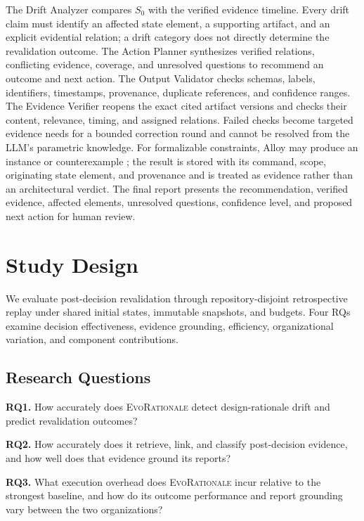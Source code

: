 \documentclass[10pt,conference]{IEEEtran}
\begin{document}
The Drift Analyzer compares $S_0$ with the verified evidence timeline. Every drift claim must identify an affected state element, a supporting artifact, and an explicit evidential relation; a drift category does not directly determine the revalidation outcome. The Action Planner synthesizes verified relations, conflicting evidence, coverage, and unresolved questions to recommend an outcome and next action. The Output Validator checks schemas, labels, identifiers, timestamps, provenance, duplicate references, and confidence ranges. The Evidence Verifier reopens the exact cited artifact versions and checks their content, relevance, timing, and assigned relations. Failed checks become targeted evidence needs for a bounded correction round and cannot be resolved from the LLM's parametric knowledge. For formalizable constraints, Alloy may produce an instance or counterexample \cite{Alhanahnah2025Alloy}; the result is stored with its command, scope, originating state element, and provenance and is treated as evidence rather than an architectural verdict. The final report presents the recommendation, verified evidence, affected elements, unresolved questions, confidence level, and proposed next action for human review.


\section{Study Design}
\label{sec:study-design}
We evaluate post-decision revalidation through repository-disjoint retrospective replay under shared initial states, immutable snapshots, and budgets. Four RQs examine decision effectiveness, evidence grounding, efficiency, organizational variation, and component contributions.
\subsection{Research Questions}
\label{sec:research-questions}

\noindent\textbf{RQ1.} How accurately does \textsc{EvoRationale} detect design-rationale drift and predict revalidation outcomes?

\noindent\textbf{RQ2.} How accurately does it retrieve, link, and classify post-decision evidence, and how well does that evidence ground its reports?

\noindent\textbf{RQ3.} What execution overhead does \textsc{EvoRationale} incur relative to the strongest baseline, and how do its outcome performance and report grounding vary between the two organizations?
\end{document}
